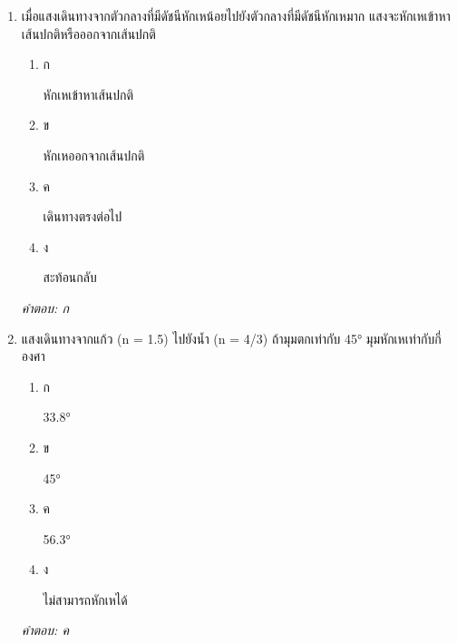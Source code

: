 \documentclass[12pt]{article}
\begin{document}
\begin{enumerate}[label=\arabic*., itemsep=0.5\baselineskip, topsep=0.5\baselineskip, leftmargin=*]
\item เมื่อแสงเดินทางจากตัวกลางที่มีดัชนีหักเหน้อยไปยังตัวกลางที่มีดัชนีหักเหมาก แสงจะหักเหเข้าหาเส้นปกติหรือออกจากเส้นปกติ
\begin{enumerate}[label=\alph*)., itemsep=0.3\baselineskip, topsep=0.3\baselineskip]
\item ก\ 
\begin{minipage}[t]{0.9\linewidth}
\raggedright หักเหเข้าหาเส้นปกติ
\end{minipage}
\item ข\ 
\begin{minipage}[t]{0.9\linewidth}
\raggedright หักเหออกจากเส้นปกติ
\end{minipage}
\item ค\ 
\begin{minipage}[t]{0.9\linewidth}
\raggedright เดินทางตรงต่อไป
\end{minipage}
\item ง\ 
\begin{minipage}[t]{0.9\linewidth}
\raggedright สะท้อนกลับ
\end{minipage}
\end{enumerate}
\vspace{-0.3\baselineskip}
\begin{small}
\textit{คำตอบ: ก}
\end{small}

\item แสงเดินทางจากแก้ว (n = 1.5) ไปยังน้ำ (n = 4/3) ถ้ามุมตกเท่ากับ 45° มุมหักเหเท่ากับกี่องศา
\begin{enumerate}[label=\alph*)., itemsep=0.3\baselineskip, topsep=0.3\baselineskip]
\item ก\ 
\begin{minipage}[t]{0.9\linewidth}
\raggedright 33.8°
\end{minipage}
\item ข\ 
\begin{minipage}[t]{0.9\linewidth}
\raggedright 45°
\end{minipage}
\item ค\ 
\begin{minipage}[t]{0.9\linewidth}
\raggedright 56.3°
\end{minipage}
\item ง\ 
\begin{minipage}[t]{0.9\linewidth}
\raggedright ไม่สามารถหักเหได้
\end{minipage}
\end{enumerate}
\vspace{-0.3\baselineskip}
\begin{small}
\textit{คำตอบ: ค}
\end{small}


\end{enumerate}
\end{document}
